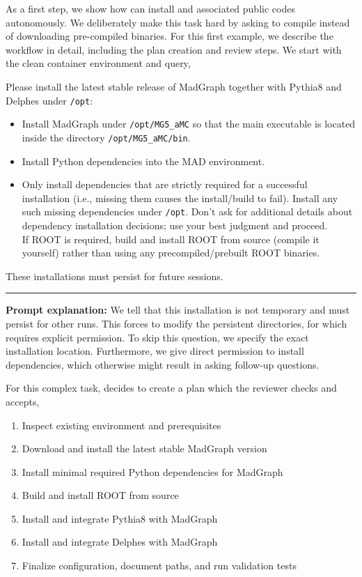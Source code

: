 \documentclass[submission, Phys]{SciPost}
\begin{document}
As a first step, we show how \ma can install \mg and associated public codes autonomously. We deliberately make this task hard by asking \ma to compile \root instead of downloading pre-compiled binaries. For this first example, we describe the \ma workflow in detail, including the plan creation and review steps. We start with the clean container environment and query,
%
\begin{userblock}[User]
Please install the latest stable release of MadGraph together with Pythia8 and Delphes under \lstinline|/opt|:
\begin{itemize}
    \item Install MadGraph under \lstinline|/opt/MG5_aMC| so that the main executable is located inside the directory \lstinline|/opt/MG5_aMC/bin|.
    \item Install Python dependencies into the MAD environment.
    \item Only install dependencies that are strictly required for a successful installation (i.e., missing them causes the install/build to fail). Install any such missing dependencies under \lstinline|/opt|. Don’t ask for additional details about dependency installation decisions; use your best judgment and proceed.\\
    If ROOT is required, build and install ROOT from source (compile it yourself) rather than using any precompiled/prebuilt ROOT binaries.
\end{itemize}

These installations must persist for future sessions.

\vspace{1em}
\hrule
\vspace{1em}

\textbf{Prompt explanation:} We tell \ma that this installation is not temporary and must persist for other \ma runs. This forces \ma to modify the persistent directories, for which \ma requires explicit permission. To skip this question, we specify the exact installation location. Furthermore, we give \ma direct permission to install dependencies, which otherwise might result in \ma asking follow-up questions.
\end{userblock}
%
For this complex task, \ma decides to create a plan which the reviewer checks and accepts,
%
\begin{planblock}[Plan]
\begin{enumerate}[leftmargin=*, label=\textbf{Step \arabic*:}, itemsep=0.6em]
\item Inspect existing environment and prerequisites
\item Download and install the latest stable MadGraph version
\item Install minimal required Python dependencies for MadGraph
\item Build and install ROOT from source
\item Install and integrate Pythia8 with MadGraph
\item Install and integrate Delphes with MadGraph
\item Finalize configuration, document paths, and run validation tests
\end{enumerate}
\end{planblock}
\end{document}
